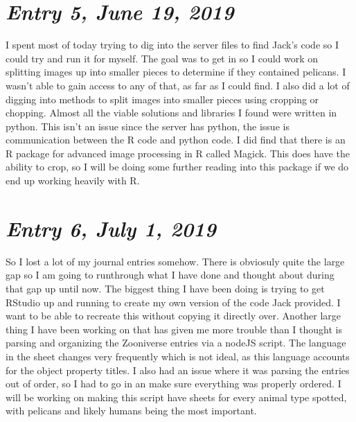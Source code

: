 \documentclass{article}
\begin{document}
\section{\Large \itshape Entry 5, June 19, 2019}
	I spent most of today trying to dig into the server files to find Jack's code so I could try and run it for myself.
The goal was to get in so I could work on splitting images up into smaller pieces to determine if they contained pelicans. I wasn't able to gain access to any of that, as far as I could find.
I also did a lot of digging into methods to split images into smaller pieces using cropping or chopping. Almost all the viable solutions and libraries I found were written in python. This isn't an issue since the server has python, the issue is communication between the R code and python code.
I did find that there is an R package for advanced image processing in R called Magick. This does have the ability to crop, so I will be doing some further reading into this package if we do end up working heavily with R.

\section{\Large \itshape Entry 6, July 1, 2019}
So I lost a lot of my journal entries somehow. There is obviosuly quite the large gap so I am going to runthrough what I have done and thought about during that gap up until now.
The biggest thing I have been doing is trying to get RStudio up and running to create my own version of the code Jack provided. I want to be able to recreate this without copying it directly over.
\newline
Another large thing I have been working on that has given me more trouble than I thought is parsing and organizing the Zooniverse entries via a nodeJS script. The language in the sheet changes very frequently which is not ideal, as this language accounts for the object property titles. I also had an issue where it was parsing the entries out of order, so I had to go in an make sure everything was properly ordered. I will be working on making this script have sheets for every animal type spotted, with pelicans and likely humans being the most important.		
\end{document}
